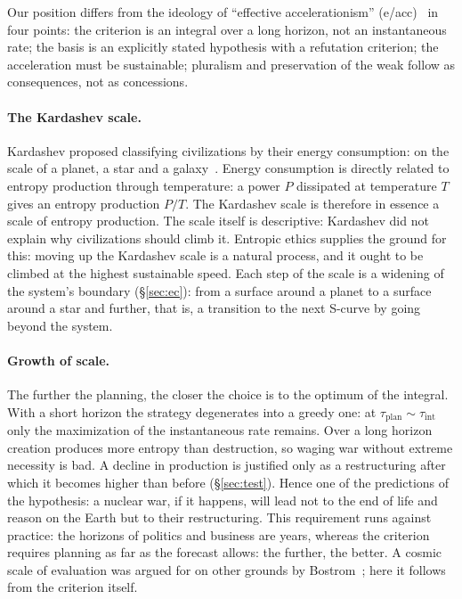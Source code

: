 \documentclass[11pt,a4paper]{article}
\newcommand{\Sref}[1]{\hyperref[#1]{\S\ref{#1}}}
\begin{document}
Our position differs from the ideology of ``effective accelerationism'' (e/acc)~\cite{jezos2022} in four points: the criterion is an integral over a long horizon, not an instantaneous rate; the basis is an explicitly stated hypothesis with a refutation criterion; the acceleration must be sustainable; pluralism and preservation of the weak follow as consequences, not as concessions.

\paragraph{The Kardashev scale.}
Kardashev proposed classifying civilizations by their energy consumption: on the scale of a planet, a star and a galaxy~\cite{kardashev1964}. Energy consumption is directly related to entropy production through temperature: a power $P$ dissipated at temperature $T$ gives an entropy production $P/T$. The Kardashev scale is therefore in essence a scale of entropy production. The scale itself is descriptive: Kardashev did not explain why civilizations should climb it. Entropic ethics supplies the ground for this: moving up the Kardashev scale is a natural process, and it ought to be climbed at the highest sustainable speed. Each step of the scale is a widening of the system's boundary (\Sref{sec:ec}): from a surface around a planet to a surface around a star and further, that is, a transition to the next S-curve by going beyond the system.

\paragraph{Growth of scale.}
The further the planning, the closer the choice is to the optimum of the integral. With a short horizon the strategy degenerates into a greedy one: at $\tau_{\mathrm{plan}}\sim\tau_{\mathrm{int}}$ only the maximization of the instantaneous rate remains. Over a long horizon creation produces more entropy than destruction, so waging war without extreme necessity is bad. A decline in production is justified only as a restructuring after which it becomes higher than before (\Sref{sec:test}). Hence one of the predictions of the hypothesis: a nuclear war, if it happens, will lead not to the end of life and reason on the Earth but to their restructuring. This requirement runs against practice: the horizons of politics and business are years, whereas the criterion requires planning as far as the forecast allows: the further, the better. A cosmic scale of evaluation was argued for on other grounds by Bostrom~\cite{bostrom2003}; here it follows from the criterion itself.
\end{document}
